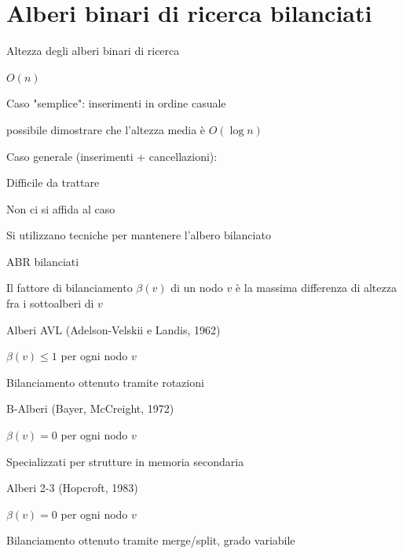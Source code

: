\section{Alberi binari di ricerca bilanciati}

\begin{frame}{Altezza degli alberi binari di ricerca}

\vspace{-9pt}
\begin{myboxtitle}
\BIL
\item $O(n)$
\EIL	
\end{myboxtitle}

\begin{myboxtitle}
\BIL
\item Caso "semplice": inserimenti in ordine casuale
  \BI
  \item \EE possibile dimostrare che l'altezza media è $O(\log n)$
  \EI
\item Caso generale (inserimenti + cancellazioni): 
  \BI
  \item Difficile da trattare
  \EI
\EIL
\end{myboxtitle}


\begin{myboxtitle}
\BIL
\item Non ci si affida al caso
\item Si utilizzano tecniche per mantenere l'albero bilanciato
\EIL
\end{myboxtitle}

\end{frame}

\begin{frame}{ABR bilanciati}

\vspace{-9pt}
\begin{myboxtitle}
Il \alert{fattore di bilanciamento} $\beta(v)$ di un nodo $v$ è la massima differenza di altezza fra i sottoalberi di $v$
\end{myboxtitle}

\BIL
\item \alert{Alberi AVL} (Adelson-Velskii e Landis, 1962)
\BI
\item $\beta(v) \leq 1$  per ogni nodo $v$
\item Bilanciamento ottenuto tramite \alert{rotazioni}
\EI
\item \alert{B-Alberi} (Bayer, McCreight,  1972)
\BI
\item $\beta(v) = 0$ per ogni nodo $v$
\item  Specializzati per strutture in memoria secondaria
\EI
\item \alert{Alberi 2-3} (Hopcroft, 1983)
\BI
\item  $\beta(v) = 0$ per ogni nodo $v$
\item Bilanciamento ottenuto tramite \alert{merge/split}, grado variabile
\EI
\EIL

\end{frame}

